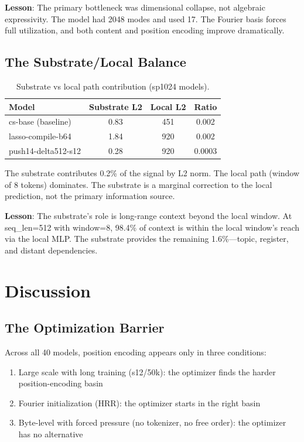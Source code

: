\documentclass[11pt,a4paper]{article}
\begin{document}
\textbf{Lesson}: The primary bottleneck was dimensional collapse, not algebraic expressivity. The model had 2048 modes and used 17. The Fourier basis forces full utilization, and both content and position encoding improve dramatically.

\subsection{The Substrate/Local Balance}

\begin{table}[h]
\centering
\caption{Substrate vs local path contribution (sp1024 models).}
\begin{tabular}{lccc}
\toprule
Model & Substrate L2 & Local L2 & Ratio \\
\midrule
cs-base (baseline) & 0.83 & 451 & 0.002 \\
lasso-compile-b64 & 1.84 & 920 & 0.002 \\
push14-delta512-s12 & 0.28 & 920 & 0.0003 \\
\bottomrule
\end{tabular}
\label{tab:balance}
\end{table}

The substrate contributes 0.2\% of the signal by L2 norm. The local path (window of 8 tokens) dominates. The substrate is a marginal correction to the local prediction, not the primary information source.

\textbf{Lesson}: The substrate's role is long-range context beyond the local window. At seq\_len=512 with window=8, 98.4\% of context is within the local window's reach via the local MLP. The substrate provides the remaining 1.6\%---topic, register, and distant dependencies.

\section{Discussion}

\subsection{The Optimization Barrier}

Across all 40 models, position encoding appears only in three conditions:
\begin{enumerate}
\item Large scale with long training (s12/50k): the optimizer finds the harder position-encoding basin
\item Fourier initialization (HRR): the optimizer starts in the right basin
\item Byte-level with forced pressure (no tokenizer, no free order): the optimizer has no alternative
\end{enumerate}
\end{document}
